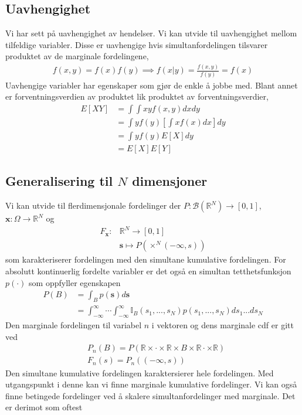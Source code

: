 \subsection{Uavhengighet}
Vi har sett på uavhengighet av hendelser. Vi kan utvide til uavhengighet mellom tilfeldige variabler. Disse er uavhengige hvis simultanfordelingen tilsvarer produktet av de marginale fordelingene,
\begin{align}
f(x,y) = f(x)f(y) \implies f(x|y)=\frac{f(x,y)}{f(y)}= f(x)
\end{align}
Uavhengige variabler har egenskaper som gjør de enkle å jobbe med. Blant annet er forventningsverdien av produktet lik produktet av forventningsverdier,
\begin{align}
E[XY]&=\int\int xyf(x,y)dxdy \\
&= \int y f(y) \left[\int x f(x)dx\right]dy \\
&= \int y f(y) E[X] dy \\
&= E[X]E[Y]
\end{align}
\subsection{Generalisering til $N$ dimensjoner}
Vi kan utvide til flerdimensjonale fordelinger der $P:\mathscr{B}(\mathbb{R}^N) \to [0,1]$, $\mathbf{x}:\Omega \to \mathbb{R}^N$ og
\begin{align}
F_\mathbf{x}: &\mathbb{R}^N \to [0,1] \\
& \mathbf{s} \mapsto P(\times^N(-\infty,s)) 
\end{align}
som karakteriserer fordelingen med den simultane kumulative fordelingen. For absolutt kontinuerlig fordelte variabler er det også en simultan tetthetsfunksjon $p(\cdot)$ som oppfyller egenskapen
\begin{align}
P(B) &= \int_B p(\mathbf{s})d\mathbf{s} \\
&= \int_{-\infty}^{\infty}\cdots \int_{-\infty}^{\infty}\mathbb{I}_B(s_1,...,s_N)p(s_1,...,s_N)ds_1...ds_N
\end{align} 
Den marginale fordelingen til variabel $n$ i vektoren og dens marginale cdf er gitt ved
\begin{align}
&P_n(B)=P(\mathbb{R}\times \cdot \times \mathbb{R} \times B \times \mathbb{R} \cdot \times \mathbb{R}) \\
& F_n(s)=P_n((-\infty,s))
\end{align}
Den simultane kumulative fordelingen karaktersierer hele fordelingen. Med utgangspunkt i denne kan vi finne marginale kumulative fordelinger. Vi kan også finne betingede fordelinger ved å skalere simultanfordelinger med marginale. Det er derimot som oftest
